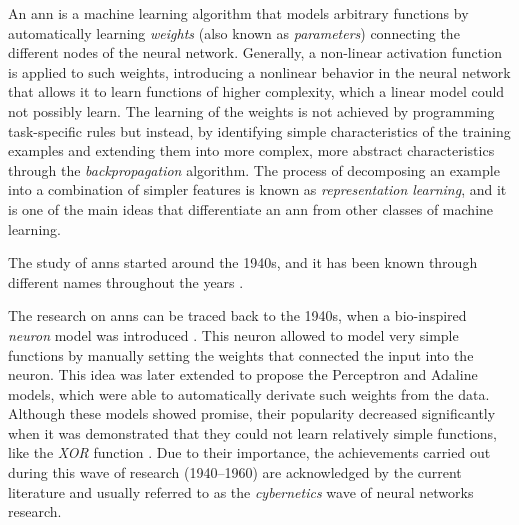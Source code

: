 

An \gls{ann} is a machine learning algorithm that models
arbitrary functions by automatically learning \emph{weights}
(also known as \emph{parameters}) connecting the different
nodes of the neural network. Generally, a non-linear
activation function is applied to such weights, introducing
a nonlinear behavior in the neural network that allows it to
learn functions of higher complexity, which a linear model
could not possibly learn. The learning of the weights is not
achieved by programming task-specific rules but instead, by
identifying simple characteristics of the training examples
and extending them into more complex, more abstract
characteristics through the \emph{backpropagation}
algorithm. The process of decomposing an example into a
combination of simpler features is known as
\emph{representation learning}, and it is one of the main
ideas that differentiate an \gls{ann} from other classes of
machine learning.

The study of \glspl{ann} started around the 1940s, and it
has been known through different names throughout the years
\parencite{goodfellow2016deep}.

The research on \glspl{ann} can be traced back to the 1940s,
when a bio-inspired \emph{neuron} model was introduced
\parencite{mcculloch1943logical}. This neuron allowed to
model very simple functions by manually setting the weights
that connected the input into the neuron. This idea was
later extended to propose the Perceptron
\parencite{rosenblatt1958perceptron} and Adaline
\parencite{widrow1960adaptive} models, which were able to
automatically derivate such weights from the data. Although
these models showed promise, their popularity decreased
significantly when it was demonstrated that they could not
learn relatively simple functions, like the \emph{XOR}
function \parencite{minsky1972perceptrons}. Due to their
importance, the achievements carried out during this wave of
research (1940--1960) are acknowledged by the current
literature \parencite{goodfellow2016deep} and usually
referred to as the \emph{cybernetics} wave of neural
networks research.

